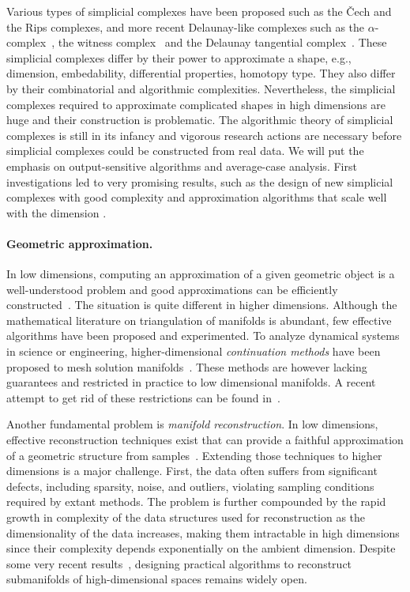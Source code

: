 Various types of simplicial complexes have been proposed such as the \v{C}ech and the Rips complexes, and more recent Delaunay-like complexes such as the $\alpha$-complex~\cite{he-ubds-95}, the witness complex~\cite{cds-tewc-2004} and the Delaunay tangential complex~\cite{geometrica-7142i}. These simplicial complexes differ by their power to approximate a shape, e.g., dimension, embedability, differential properties, homotopy type. They also differ by their combinatorial and algorithmic complexities. Nevertheless, the simplicial complexes required to approximate complicated shapes in high dimensions are huge and their construction is problematic.  The algorithmic theory of simplicial complexes is still in its infancy and  vigorous research actions are necessary before simplicial complexes could be constructed from real data. We will put the emphasis on output-sensitive algorithms and average-case analysis.  First investigations led to very promising results, such as the design of new simplicial complexes with good complexity and approximation algorithms that scale well with the dimension \cite{geometrica-7142i,cds-tewc-2004}.

\paragraph{Geometric approximation.}
In low dimensions, computing an approximation of a given geometric object is a well-understood problem and good approximations can be efficiently constructed~\cite{geometrica-bcmrv-ms-06,he-gtmg-2001}.  The situation is quite different in higher dimensions.  Although the mathematical literature on triangulation of manifolds is abundant, few effective algorithms have been proposed and experimented. 
To analyze {dynamical systems} in science or engineering, higher-dimensional {\em continuation methods} have been proposed to mesh solution manifolds~\cite{mh-mpc-2002}. These methods are however lacking guarantees and restricted in practice to low dimensional manifolds. A recent attempt to get rid of these restrictions can be found in~\cite{}.

Another fundamental problem is {\em manifold reconstruction}.  In low dimensions, effective reconstruction techniques exist that can provide a faithful approximation of a geometric structure from samples~\cite{dey-csr-2007}. %
Extending those techniques to higher dimensions is a major challenge.  First, the data often suffers from significant defects, including sparsity, noise, and outliers, violating sampling conditions required by extant methods. The problem is further compounded by the rapid growth in complexity of the data structures used for reconstruction as the dimensionality of the data increases, making them intractable in high dimensions since their complexity depends exponentially on the ambient dimension. Despite some very recent results~\cite{geometrica-7142i}, designing practical algorithms to reconstruct submanifolds of high-dimensional spaces remains widely open.  

